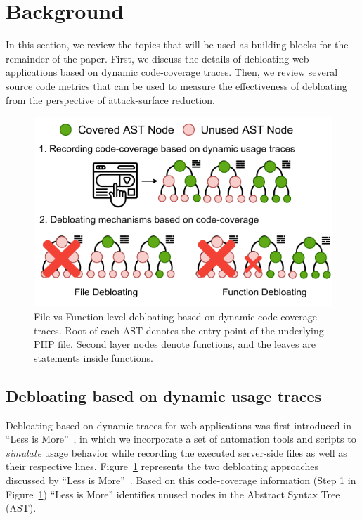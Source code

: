 \section{Background}

In this section, we review the topics that will be used as building blocks for the remainder of the paper. 
First, we discuss the details of debloating web applications based on dynamic code-coverage traces. 
Then, we review several source code metrics that can be used to measure the effectiveness of debloating from the perspective of attack-surface reduction.

\begin{figure}[t]
    \centering
    \includegraphics[width=0.75\columnwidth]{figures/dbltr/file_vs_function_debloating.drawio.pdf}
    \caption{File vs Function level debloating based on dynamic code-coverage traces. Root of each AST denotes the entry point of the underlying PHP file. Second layer nodes denote functions, and the leaves are statements inside functions.}
    \label{fig:file_vs_func_debloating}
\end{figure}

\subsection{Debloating based on dynamic usage traces}
Debloating based on dynamic traces for web applications was first introduced in ``Less is More''~\cite{lessismore}, in which we incorporate a set of automation tools and scripts to \emph{simulate} usage behavior while recording the executed server-side files as well as their respective lines.
Figure~\ref{fig:file_vs_func_debloating} represents the two debloating approaches discussed by ``Less is More''~\cite{lessismore}. 
Based on this code-coverage information (Step 1 in Figure~\ref{fig:file_vs_func_debloating}) ``Less is More'' identifies unused nodes in the Abstract Syntax Tree (AST). 

